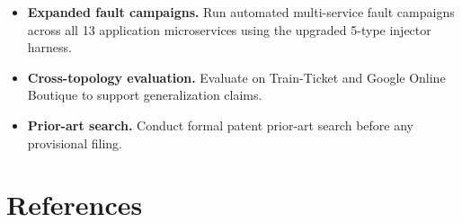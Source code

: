 \documentclass[11pt,a4paper]{article}
\begin{document}
\begin{itemize}[leftmargin=1.5em,itemsep=2pt]
  \item \textbf{Expanded fault campaigns.} Run automated multi-service fault campaigns across all 13 application microservices using the upgraded 5-type injector harness.
  \item \textbf{Cross-topology evaluation.} Evaluate on Train-Ticket and Google Online Boutique to support generalization claims.
  \item \textbf{Prior-art search.} Conduct formal patent prior-art search before any provisional filing.
\end{itemize}

\section{References}
\end{document}
